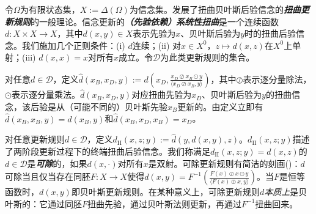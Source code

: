 \documentclass[12pt,letterpaper]{article}
\newenvironment{translation}{\color{blue}}{}
\theoremstyle{plain}
\theoremstyle{definition}
\theoremstyle{remark}
\theoremstyle{definition}
\begin{document}
\begin{translation}
令$\Omega$为有限状态集，$X:=\Delta(\Omega)$为信念集。\citet{cripps2018divisible}发展了扭曲贝叶斯后验信念的\textit{\textbf{扭曲更新规则}}的一般理论。信念更新的\textit{\textbf{（先验依赖）系统性扭曲}}是一个连续函数$d:X\times X \to X$，其中$d(x, y) \in X$表示先验为$x$、贝叶斯后验为$y$时的扭曲后验信念。我们施加几个正则条件：(i) $d$连续；(ii) 对$x \in X^0$，$z \mapsto d(x,z)$在$X^0$上单射；(iii) $d(x,x)=x$对所有$x$成立。令$\mathcal{D}$为此类更新规则的集合。

对任意$d \in \mathcal{D}$，定义$\hat{d}(x_B,x_D,y):=d(x_D,\frac{x_D \oslash x_B \odot y}{\langle x_D \oslash x_B,y\rangle})$，其中$\oslash$表示逐分量除法，$\odot$表示逐分量乘法。$\hat{d}(x_B,x_D,y)$对应扭曲先验为$x_D$、贝叶斯后验为$y$的扭曲信念，该后验是从（可能不同的）贝叶斯先验$x_B$更新的。由定义立即有$\hat{d}(x_B,x_B,y)=d(x_B,y)$和$\hat{d}(x_B,x_D,x_B)=x_D$。

对任意更新规则$d \in \mathcal{D}$，定义$d_{\mathrm{II}}(x,z;y):=\hat{d}(y,d(x,y),z)$。$d_{\mathrm{II}}(x,z;y)$描述了两阶段更新过程下的终端扭曲后验信念。我们称满足$d_{\mathrm{II}}(x,z;y)=d(x,z)$的$d \in \mathcal{D}$是\textit{\textbf{可除}}的，如果$d(x,\cdot)$对所有$x$是双射。可除更新规则有简洁的刻画(\citet{cripps2018divisible})：$d$可除当且仅当存在同胚$F:X \to X$使得$d(x,y)=F^{-1}(\frac{F(x)\oslash x \odot y}{\langle F(x)\oslash x,y \rangle})$。当$F$是恒等函数时，$d(x,y)$即贝叶斯更新规则。在某种意义上，可除更新规则$d$\textit{本质上}是贝叶斯的：它通过同胚$F$扭曲先验，通过贝叶斯法则更新，再通过$F^{-1}$扭曲回来。
\end{translation}
\end{document}
